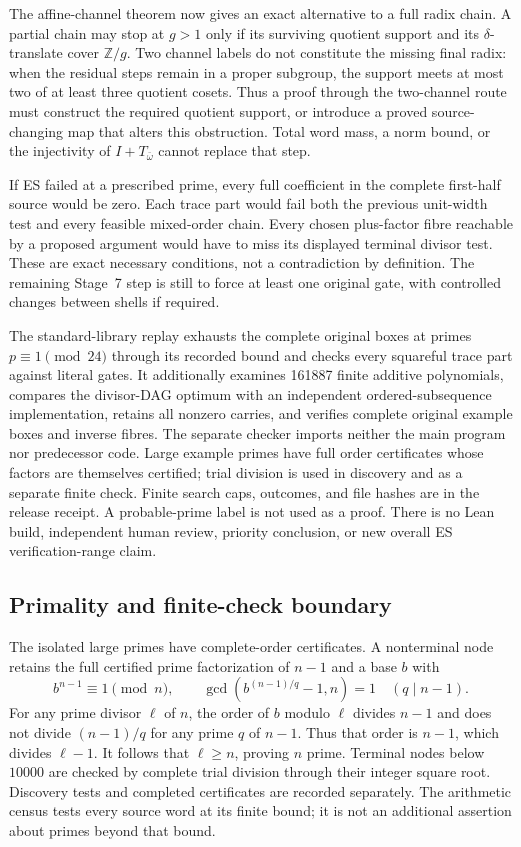 The affine-channel theorem now gives an exact alternative to a full radix
chain. A partial chain may stop at $g>1$ only if its surviving quotient support
and its $\delta$-translate cover $\mathbb Z/g$. Two channel labels do not
constitute the missing final radix: when the residual steps remain in a proper
subgroup, the support meets at most two of at least three quotient cosets.
Thus a proof through the two-channel route must construct the required quotient
support, or introduce a proved source-changing map that alters this obstruction.
Total word mass, a norm bound, or the injectivity of $I+T_{\bar\omega}$ cannot
replace that step.

If ES failed at a prescribed prime, every full coefficient in the complete
first-half source would be zero. Each trace part would fail both the previous
unit-width test and every feasible mixed-order chain. Every chosen plus-factor
fibre reachable by a proposed argument would have to miss its displayed
terminal divisor test. These are exact necessary conditions, not a contradiction
by definition. The remaining Stage~7 step is still to force at least one
original gate, with controlled changes between shells if required.

The standard-library replay exhausts the complete original boxes at primes
$p\equiv1\pmod{24}$ through its recorded bound and checks every squareful
trace part against literal gates. It additionally examines 161887 finite
additive polynomials, compares the divisor-DAG optimum with an independent
ordered-subsequence implementation, retains all nonzero carries, and verifies
complete original example boxes and inverse fibres. The separate checker imports
neither the main program nor predecessor code. Large example primes have full
order certificates whose factors are themselves certified; trial division is
used in discovery and as a separate finite check. Finite search caps, outcomes,
and file hashes are in the release receipt. A probable-prime label is not used
as a proof. There is no Lean build, independent human review, priority
conclusion, or new overall ES verification-range claim.

\subsection{Primality and finite-check boundary}
The isolated large primes have complete-order certificates. A nonterminal node
retains the full certified prime factorization of $n-1$ and a base $b$ with
\[
 b^{n-1}\equiv1\pmod n,\qquad
 \gcd(b^{(n-1)/q}-1,n)=1\quad(q\mid n-1).
\]
For any prime divisor $\ell$ of $n$, the order of $b$ modulo $\ell$ divides
$n-1$ and does not divide $(n-1)/q$ for any prime $q$ of $n-1$. Thus that order
is $n-1$, which divides $\ell-1$. It follows that $\ell\ge n$, proving $n$
prime. Terminal nodes below $10000$ are checked by complete trial division
through their integer square root. Discovery tests and completed certificates
are recorded separately. The arithmetic census tests every source word at its
finite bound; it is not an additional assertion about primes beyond that bound.
